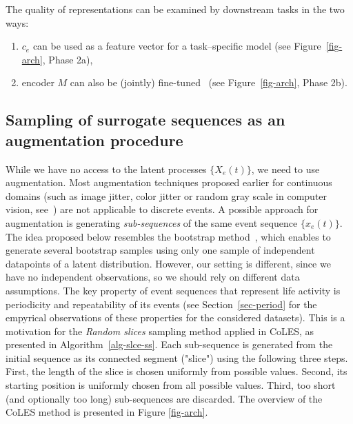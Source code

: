\documentclass[sigconf]{acmart}
\begin{document}
The quality of representations can be examined by downstream tasks in the two ways:
\begin{enumerate}
\item $c_e$ can be used as a feature vector for a task--specific model (see Figure~\ref{fig-arch}, Phase 2a),
\item encoder $M$ can also be (jointly) fine-tuned~\citep{Yosinski2014HowTA} (see Figure~\ref{fig-arch}, Phase 2b).
\end{enumerate}

\subsection{Sampling of surrogate sequences as an augmentation procedure} \label{sec-pos-pairs}

While we have no access to the latent processes $\{X_e(t)\}$, we need to use augmentation. Most augmentation techniques proposed earlier for continuous domains (such as image jitter, color jitter or random gray scale in computer vision, see~\citep{Falcon2020AFF}) are not applicable to discrete events. A possible approach for augmentation is generating
{\it sub-sequences} of the same event sequence $\{x_e(t)\}$. The idea proposed below resembles the bootstrap method~\citep{Efron1994Bootstrap}, which enables to generate several bootstrap samples using only one sample of independent datapoints of a latent distribution. However, our setting is different, since we have no independent observations, so we should rely on different data assumptions. 
The key property of event sequences that represent life activity is periodicity and repeatability of its events (see Section~\ref{sec-period} for the empyrical observations of these properties for the considered datasets). This is a motivation for the \textit{Random slices} sampling method applied in CoLES, as presented in Algorithm~\ref{alg-slce-ss}. Each sub-sequence is generated from the initial sequence as its connected segment ("slice") using the following three steps. First, the length of the slice is chosen uniformly from possible values. Second, its starting position is uniformly chosen from all possible values. Third, too short (and optionally too long) sub-sequences are discarded.
The overview of the CoLES method is presented in Figure \ref{fig-arch}.
\end{document}
